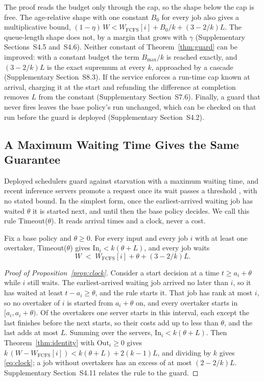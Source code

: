 The proof reads the budget only through the cap, so the shape below the cap is free. The
age-relative shape with one constant $B_0$ for every job also gives a multiplicative bound,
$(1 - \eta)\,W < W_{\mathrm{FCFS}}[i] + B_0/k + (3 - 2/k)L$. The queue-length shape does
not, by a margin that grows with $\gamma$ (Supplementary Sections~S4.5 and~S4.6). Neither
constant of Theorem~\ref{thm:guard} can be improved: with a constant budget the term
$B_{\max}/k$ is reached exactly, and $(3-2/k)L$ is the exact supremum at every $k$,
approached by a cascade (Supplementary Section~S8.3). If the service enforces a run-time cap
known at arrival, charging it at the start and refunding the difference at completion
removes $L$ from the constant (Supplementary Section~S7.6). Finally, a guard that never
fires leaves the base policy's run unchanged, which can be checked on that run before the
guard is deployed (Supplementary Section~S4.2).

\subsection{A Maximum Waiting Time Gives the Same Guarantee}
\label{sec:clock}

Deployed schedulers guard against starvation with a maximum waiting time, and recent
inference servers promote a request once its wait passes a threshold
\cite{wu2023fastserve,luo2025autellix}, with no stated bound. In the simplest form, once
the earliest-arrived waiting job has waited $\theta$ it is started next, and until then the
base policy decides. We call this rule Timeout($\theta$). It reads arrival times and a
clock, never a cost.

\begin{proposition}
\label{prop:clock}
Fix a base policy and $\theta \ge 0$. For every input and every job $i$ with at least one
overtaker, Timeout($\theta$) gives $\mathrm{In}_i < k(\theta + L)$, and every job waits
\begin{equation}
  W \;<\; W_{\mathrm{FCFS}}[i] + \theta + (3 - 2/k)L .
  \label{eq:clock}
\end{equation}
\end{proposition}

\begin{proof}[Proof of Proposition~\ref{prop:clock}]
Consider a start decision at a time $t \ge a_i + \theta$ while $i$ still waits. The
earliest-arrived waiting job arrived no later than $i$, so it has waited at least
$t - a_i \ge \theta$, and the rule starts it. That job has rank at most $i$, so no
overtaker of $i$ is started from $a_i + \theta$ on, and every overtaker starts in
$[a_i, a_i + \theta)$. Of the overtakers one server starts in this interval, each except
the last finishes before the next starts, so their costs add up to less than $\theta$, and
the last adds at most $L$. Summing over the servers, $\mathrm{In}_i < k(\theta + L)$. Then
Theorem~\ref{thm:identity} with $\mathrm{Out}_i \ge 0$ gives $k\,(W - W_{\mathrm{FCFS}}[i]) <
k(\theta + L) + 2(k-1)L$, and dividing by $k$ gives \eqref{eq:clock}; a job without
overtakers has an excess of at most $(2 - 2/k)L$. Supplementary Section~S4.11 relates the
rule to the guard.
\end{proof}

